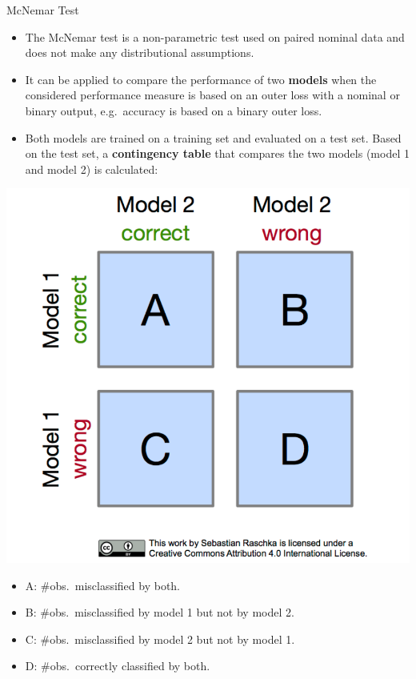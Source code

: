     \begin{frame}[c,allowframebreaks]{McNemar Test}
    \begin{itemize}
    \item The McNemar test is a non-parametric test used on paired nominal data and does not make any distributional assumptions.
    \item It can be applied to compare the performance of two \textbf{models}
        when the considered performance measure is based on an outer loss with a
        nominal or binary output, e.g.\ accuracy is based on a binary outer loss.
    \item Both models are trained on a training set and evaluated on a test set. Based on the test set, a \textbf{contingency table} that compares the two models (model 1 and model 2) is calculated:
    \end{itemize}

    \medskip
    \begin{minipage}{0.25\textwidth}
    \includegraphics[width=\textwidth]{mcnemar_1.png}
    \end{minipage}
    \begin{minipage}{0.74\textwidth}
    \begin{itemize}
    \item A: $\#$obs.\ misclassified by both.
    \item B: $\#$obs.\ misclassified by model 1 but not by model 2.
    \item C: $\#$obs.\ misclassified by model 2 but not by model 1.
    \item D: $\#$obs.\ correctly classified by both.
    \end{itemize}
    \end{minipage}


\end{frame}
